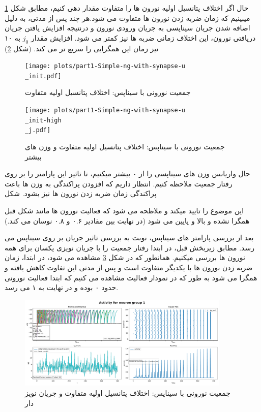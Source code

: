 \documentclass{report}
\begin{document}
        حال اگر اختلاف پتانسیل اولیه نورون ها را متفاوت مقدار دهی کنیم، مطابق شکل
        \ref{fig:part1-simple-ng-with-synapse-u-init}
        میبینیم که زمان ضربه زدن نورون ها متفاوت می شود.هر چند پس از مدتی، به دلیل اضافه شدن جریان سیناپسی به جریان ورودی نورون و درنتیجه افزایش یافتن جریان دریافتی نورون، این اختلاف زمانی ضربه ها نیز کمتر می شود. افزایش مقدار 
        $j_0$ 
        به ۱۰ نیز زمان این همگرایی را سریع تر می کند.
        (شکل \ref{fig:part1-simple-ng-with-synapse-u-init-high-j})
        \begin{figure}[!ht]
            \centering
            \texttt{[image: plots/part1-Simple-ng-with-synapse-u\\\_init.pdf]} 
            \caption{جمعیت نورونی با سیناپس: اختلاف پتانسیل اولیه متفاوت}
            \label{fig:part1-simple-ng-with-synapse-u-init}
        \end{figure}
        \begin{figure}[!ht]
            \centering
            \texttt{[image: plots/part1-Simple-ng-with-synapse-u\\\_init-high\\\_j.pdf]} 
            \caption{جمعیت نورونی با سیناپس: اختلاف پتانسیل اولیه متفاوت و وزن های بیشتر}
            \label{fig:part1-simple-ng-with-synapse-u-init-high-j}
        \end{figure}

        حال واریانس وزن های سیناپسی را از ۰ بیشتر میکنیم، تا تاثیر این پارامتر را بر روی رفتار جمعیت ملاحظه کنیم. انتظار داریم که افزودن پراکندگی به وزن ها باعث پراکندگی زمان ضربه زدن نورون ها نیز بشود. شکل 

        این موضوع را تایید میکند و ملاظحه می شود که فعالیت نورون ها مانند شکل قبل همگرا نشده و بالا و پایین می شود
        (در نهایت بین مقادیر ۰.۶ و ۰.۸ نوسان می کند.)

        بعد از بررسی پارامتر های سیناپس، نوبت به بررسی تاثیر جریان بر روی سیناپس می رسد. مطابق زیربخش قبل، در ابتدا رفتار جمعیت را با جریان نویزی یکسان برای همه نورون ها بررسی میکنیم. همانطور که در شکل
        \ref{fig:part1-simple-ng-with-synapse-noise-curr}
        مشاهده می شود، در ابتدا، زمان ضربه زدن نورون ها با یکدیگر متفاوت است و پس از مدتی این تفاوت کاهش یافته و همگرا می شود به طور که در نمودار فعالیت مشاهده می کنیم که ابتدا فعالیت نورونی حدود ۰ بوده و در نهایت به ۱ می رسد.
        \begin{figure}[!ht]
            \centering
            \includegraphics[width=0.9\textwidth]{plots/part1-Simple-ng-with-synapse-noise-curr.pdf} 
            \caption{جمعیت نورونی با سیناپس: اختلاف پتانسیل اولیه متفاوت و جریان نویز دار}
            \label{fig:part1-simple-ng-with-synapse-noise-curr}
        \end{figure}
\end{document}

